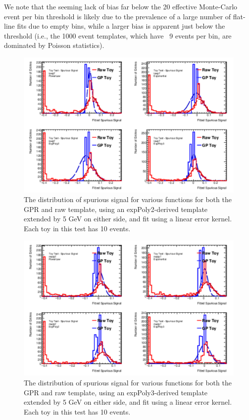 We note that the seeming lack of bias far below the 20 effective Monte-Carlo event per bin threshold is likely due to the prevalence of a large number of flat-line fits due to empty bins, while a larger bias is apparent just below the threshold (i.e., the 1000 event templates, which have ~9 events per bin, are dominated by Poisson statistics).

\begin{figure} 
\begin{center}
  \includegraphics[width=\textwidth]{figures/background/gpr/validation/linear/ToyTest_FitSigVals_lowpT_10_noSig}   
\caption{The distribution of spurious signal for various functions for both the GPR and raw template, using an expPoly2-derived template extended by 5 GeV on either side, and fit using a linear error kernel. Each toy in this test has 10 events.}
\label{fig:linearkernel_lowpt_10_noSig}
\end{center}
\end{figure}

\begin{figure} 
\begin{center}
  \includegraphics[width=\textwidth]{figures/background/gpr/validation/linear/ToyTest_FitSigVals_medpT_10_noSig}   
\caption{The distribution of spurious signal for various functions for both the GPR and raw template, using an expPoly3-derived template extended by 5 GeV on either side, and fit using a linear error kernel. Each toy in this test has 10 events.}
\label{fig:linearkernel_medpt_10_noSig}
\end{center}
\end{figure}

